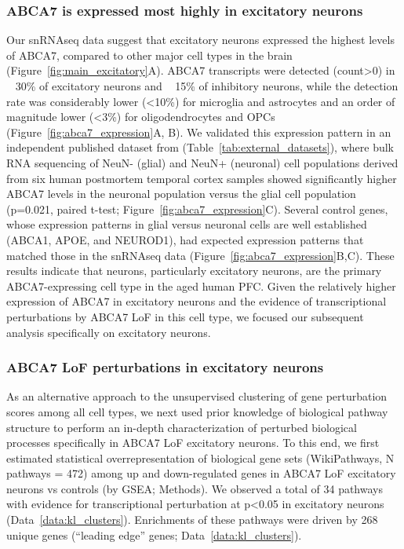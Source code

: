 \subsubsection{ABCA7 is expressed most highly in excitatory neurons}
Our snRNAseq data suggest that excitatory neurons expressed the highest levels of ABCA7, compared to other major cell types in the brain (Figure~\ref{fig:main_excitatory}A).  ABCA7 transcripts were detected (count>0) in ~ 30\% of excitatory neurons and ~ 15\% of inhibitory neurons, while the detection rate was considerably lower (<10\%) for microglia and astrocytes and an order of magnitude lower (<3\%) for oligodendrocytes and OPCs (Figure~\ref{fig:abca7_expression}A, B). We validated this expression pattern in an independent published dataset from\cite{Welch2022-ef} (Table~\ref{tab:external_datasets}), where bulk RNA sequencing of NeuN- (glial) and NeuN+ (neuronal) cell populations derived from six human postmortem temporal cortex samples showed significantly higher ABCA7 levels in the neuronal population versus the glial cell population (p=0.021, paired t-test; Figure~\ref{fig:abca7_expression}C). Several control genes, whose expression patterns in glial versus neuronal cells are well established (ABCA1, APOE, and NEUROD1), had expected expression patterns that matched those in the snRNAseq data (Figure~\ref{fig:abca7_expression}B,C). These results indicate that neurons, particularly excitatory neurons, are the primary ABCA7-expressing cell type in the aged human PFC. Given the relatively higher expression of ABCA7 in excitatory neurons and the evidence of transcriptional perturbations by ABCA7 LoF in this cell type, we focused our subsequent analysis specifically on excitatory neurons.

\subsubsection{ABCA7 LoF perturbations in excitatory neurons}
As an alternative approach to the unsupervised clustering of gene perturbation scores among all cell types, we next used prior knowledge of biological pathway structure to perform an in-depth characterization of perturbed biological processes specifically in ABCA7 LoF excitatory neurons. To this end, we first estimated statistical overrepresentation of biological gene sets (WikiPathways, N pathways = 472) among up and down-regulated genes in ABCA7 LoF excitatory neurons vs controls (by GSEA; Methods). We observed a total of 34 pathways with evidence for transcriptional perturbation at p<0.05 in excitatory neurons (Data~\ref{data:kl_clusters}). Enrichments of these pathways were driven by 268 unique genes (“leading edge” genes\cite{Subramanian2005-pu}; Data~\ref{data:kl_clusters}).   

